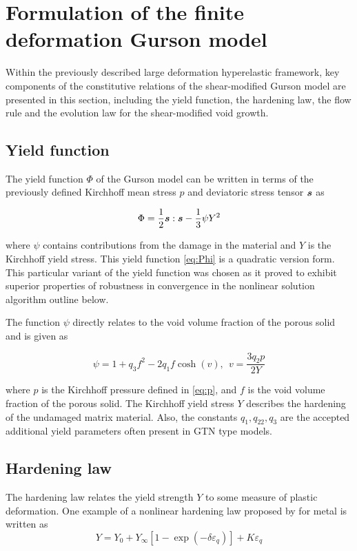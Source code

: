 \documentclass[11pt]{article}
\theoremstyle{remark}
\begin{document}
\section{Formulation of the finite deformation Gurson model} \label{sec:formulation}
Within the previously described large deformation hyperelastic
framework, key components of the constitutive relations of the
shear-modified Gurson model are presented in this section, including
the yield function, the hardening law, the flow rule and the 
evolution law for the shear-modified void growth.

\subsection{Yield function}
The yield function $\Phi$ of the Gurson model can be written in terms
of the previously defined Kirchhoff mean stress $p$ and deviatoric
stress tensor ${\boldsymbol{s}}$ as

\begin{equation}\label{eq:Phi}
\Phi = \frac{1}{2}{\boldsymbol{s}}:{\boldsymbol{s}} - \frac{1}{3}\psi Y^2
\end{equation}

where $\psi$ contains contributions from the damage in the material
and $Y$ is the Kirchhoff yield stress. This yield function
\eqref{eq:Phi} is a quadratic version form. This particular variant 
of the yield function was chosen as it proved to exhibit superior
properties of robustness in convergence in the nonlinear solution
algorithm outline below.

The function $\psi$ directly relates to the void volume fraction of
the porous solid and is given as

\begin{equation}
\psi = 1 + q_3 f^2 - 2 q_1 f \cosh(v), ~~v=\frac{3 q_2 p}{2 Y}
\end{equation}

where $p$ is the Kirchhoff pressure defined in \eqref{eq:p}, and $f$
is the void volume fraction of the porous solid. The Kirchhoff yield
stress $Y$ describes the hardening of the undamaged matrix
material. Also, the constants $q_1,q_22,q_3$ are the accepted
additional yield parameters often present in GTN type models.

\subsection{Hardening law}
The hardening law relates the yield strength $Y$ to some measure of
plastic deformation. One example of a nonlinear hardening law proposed
by \cite{SimoHughes:98} for metal is written as
\begin{equation}
Y = Y_0 + Y_{\infty}\left[ 1-\exp(-\delta\varepsilon_q)\right] +
K\varepsilon_q
\end{equation}
\end{document}
